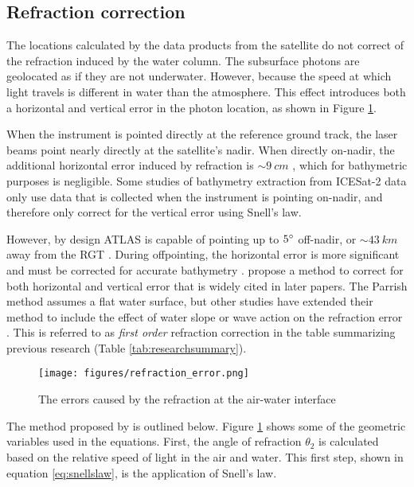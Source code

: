 \subsection{Refraction correction}

The locations calculated by the data products from the satellite do not correct of the refraction induced by the water column. The subsurface photons are geolocated as if they are not underwater. However, because the speed at which light travels is different in water than the atmosphere. This effect introduces both a horizontal and vertical error in the photon location, as shown in Figure \ref{refract-image}.

When the instrument is pointed directly at the reference ground track, the laser beams point nearly directly at the satellite's nadir. When directly on-nadir, the additional horizontal error induced by refraction is $\sim 9~cm$ \parencite{Parrish2019}, which for bathymetric purposes is negligible. Some studies of bathymetry extraction from ICESat-2 data only use data that is collected when the instrument is pointing on-nadir, and therefore only correct for the vertical error using Snell's law.

However, by design ATLAS is capable of pointing up to $5 \degree$ off-nadir, or $\sim43~km$ away from the RGT \parencite{Magruder2021}. During offpointing, the horizontal error is more significant and must be corrected for accurate bathymetry \parencite{Parrish2019}. \citeauthor{Parrish2019} propose a method to correct for both horizontal and vertical error that is widely cited in later papers. The Parrish method assumes a flat water surface, but other studies have extended their method to include the effect of water slope or wave action on the refraction error \parencite{Ma2020,Zhang2022}.  This is referred to as \emph{first order} refraction correction in the table summarizing previous research (Table \ref{tab:researchsummary}).


\begin{figure}[ht]
      \centering
      \texttt{[image: figures/refraction\_error.png]}
      \caption{The errors caused by the refraction at the air-water interface}
      \label{refract-image}
\end{figure}

The method proposed by \citeauthor{Parrish2019} is outlined below. Figure \ref{refract-image} shows some of the geometric variables used in the equations. First, the angle of refraction $\theta_2$ is calculated based on the relative speed of light in the air and water. This first step, shown in equation \ref{eq:snellslaw}, is the application of Snell's law.

